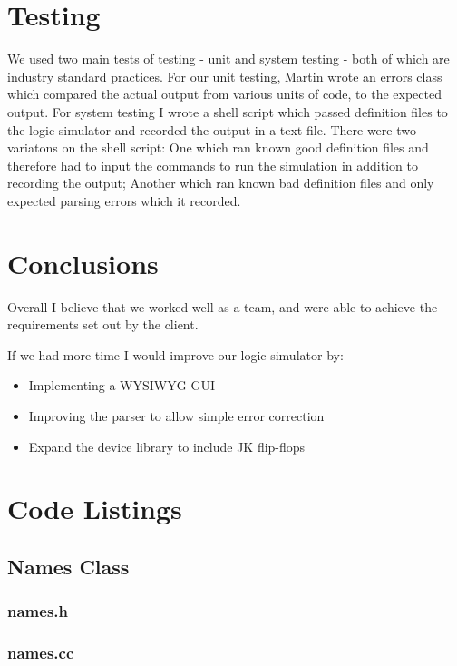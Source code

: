 \documentclass[a4paper,10pt]{article}
\begin{document}
\section{Testing}

We used two main tests of testing - unit and system testing - both of which are industry standard practices. For our unit testing, Martin wrote an errors class which compared the actual output from various units of code, to the expected output. For system testing I wrote a shell script which passed definition files to the logic simulator and recorded the output in a text file. There were two variatons on the shell script: One which ran known good definition files and therefore had to input the commands to run the simulation in addition to recording the output; Another which ran known bad definition files and only expected parsing errors which it recorded.

\section{Conclusions}

Overall I believe that we worked well as a team, and were able to achieve the requirements set out by the client.

If we had more time I would improve our logic simulator by:

\begin{itemize}
\item Implementing a WYSIWYG GUI
\item Improving the parser to allow simple error correction
\item Expand the device library to include JK flip-flops
\end{itemize}

\pagebreak

\appendix
\section{Code Listings}
\subsection{Names Class}
\subsubsection{names.h}

\subsubsection{names.cc}

\end{document}
